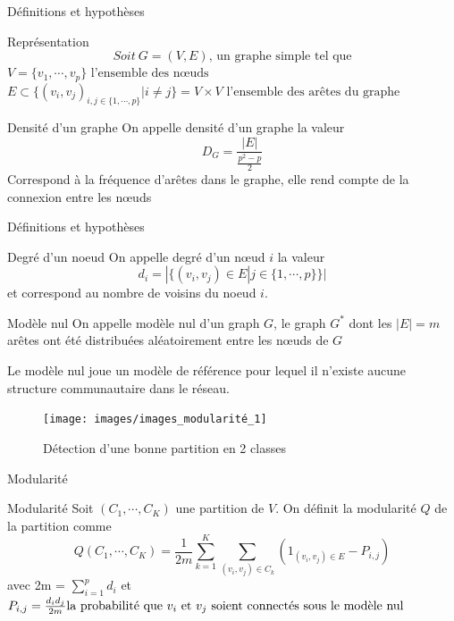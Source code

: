 \documentclass[11pt]{beamer}
\begin{document}
	\begin{frame}{Définitions et hypothèses}
		\scriptsize
		\begin{block}{Représentation}
			\[
			Soit~G = (V,E)\text{, un graphe simple tel que}
			\]
			$V = \{v_1, \cdots, v_p\} \text{ l'ensemble des nœuds }$
			$E \subset{\{ (v_i,v_j)_{i,j \in \{1,\cdots,p\}}| i \neq j \}} = V\times V \text{ l'ensemble des arêtes du graphe}$
		\end{block}
		\scriptsize
		\begin{block}{Densité d'un graphe}
			On appelle densité d'un graphe la valeur
			\[
			D_G = \frac{|E|}{\frac{p^2-p}{2}}
			\]
			Correspond à la fréquence d'arêtes dans le graphe, elle rend compte de la connexion entre les nœuds
		\end{block}
	\end{frame}
	\begin{frame}{Définitions et hypothèses}
		\small
		\begin{block}{Degré d'un noeud}
			On appelle degré d'un nœud $i$ la valeur 
			\[
			d_i = |\{(v_i,v_j) \in E | j \in {\{1,\cdots,p\}} \}| 
			\]
			et correspond au nombre de voisins du noeud $i$.
		\end{block}
		\small
		\begin{block}{Modèle nul}
			On appelle modèle nul d'un graph $G$, le graph $G^*$ dont les $|E| = m$ arêtes ont été distribuées aléatoirement entre les nœuds de $G$\newline

			Le modèle nul joue un modèle de référence pour lequel il n'existe aucune structure communautaire dans le réseau.
		\end{block}
	\end{frame}
	\begin{frame}
		\begin{figure}[H]
			\centering
			\texttt{[image: images/images\_modularité\_1]}
			\caption{Détection d'une bonne partition en 2 classes}
		\end{figure}
	\end{frame}
	\begin{frame}{Modularité}
		\small
		\begin{block}{Modularité}
			Soit $(C_1,\cdots,C_K)$ une partition de $V$.
			On définit la modularité $Q$ de la partition comme 
			\[
			Q(C_1,\cdots,C_K) = \frac{1}{2m}\displaystyle\sum_{k=1}^K \displaystyle\sum_{(v_i,v_j)\in C_k} (1_{(v_i,v_j) \in E} - P_{i,j})
			\]
			avec 2m = $\displaystyle\sum_{i=1}^p d_i$ et $P_{i,j} = \frac{d_i d_j}{2m} \newline
			\text{la probabilité que $v_i$ et $v_j$ soient connectés sous le modèle nul}$
		\end{block}
	\end{frame}
\end{document}
